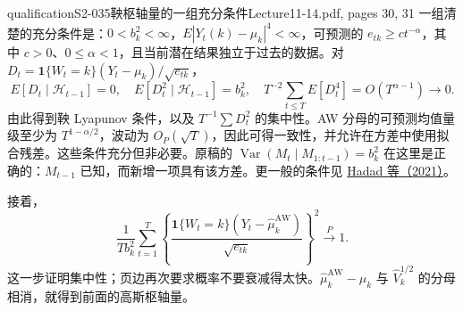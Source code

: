 \begin{reviewnote}{qualification}{S2-035}{鞅枢轴量的一组充分条件}{Lecture11-14.pdf, pages 30, 31}
一组清楚的充分条件是：$0<b_k^2<\infty$，$E|Y_t(k)-\mu_k|^4<\infty$，可预测的 $e_{tk}\ge c t^{-\alpha}$，其中 $c>0$、$0\le\alpha<1$，且当前潜在结果独立于过去的数据。对 $D_t=\mathbf1\{W_t=k\}(Y_t-\mu_k)/\sqrt{e_{tk}}$，
\[
 E[D_t\mid\mathcal H_{t-1}]=0,\quad E[D_t^2\mid\mathcal H_{t-1}]=b_k^2,\quad
 T^{-2}\sum_{t\le T}E[D_t^4]=O(T^{\alpha-1})\to0.
\]
由此得到鞅 Lyapunov 条件，以及 $T^{-1}\sum D_t^2$ 的集中性。AW 分母的可预测均值量级至少为 $T^{1-\alpha/2}$，波动为 $O_P(\sqrt T)$，因此可得一致性，并允许在方差中使用拟合残差。这些条件充分但非必要。原稿的 $\operatorname{Var}(M_t\mid M_{1:t-1})=b_k^2$ 在这里是正确的：$M_{t-1}$ 已知，而新增一项具有该方差。更一般的条件见 \href{https://pmc.ncbi.nlm.nih.gov/articles/PMC8054003/}{Hadad 等（2021）}。
\end{reviewnote}


接着，
\[
 \frac1{Tb_k^2}\sum_{t=1}^T
 \left\{\frac{\mathbf1\{W_t=k\}(Y_t-\widehat\mu_k^{\mathrm{AW}})}
 {\sqrt{e_{tk}}}\right\}^{\!2}
 \xrightarrow{P}1.
\]
这一步证明集中性；页边再次要求概率不要衰减得太快。$\widehat\mu_k^{\mathrm{AW}}-\mu_k$ 与 $\widehat V_k^{1/2}$ 的分母相消，就得到前面的高斯枢轴量。
